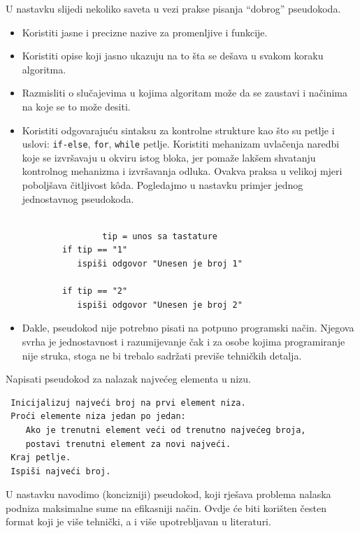 U nastavku slijedi nekoliko saveta u vezi prakse pisanja ``dobrog''  pseudo\-koda.
\begin{itemize}
	\item Koristiti jasne i precizne nazive za promenljive i funkcije.
	\item Koristiti opise koji jasno ukazuju na to šta se dešava u svakom koraku algoritma. 
	\item Razmisliti o slučajevima u kojima algoritam može da se zaustavi i načinima na koje  se to može desiti.
	\item Koristiti odgovarajuću sintaksu za kontrolne strukture kao što su petlje i uslovi: \texttt{if-else}, \texttt{for}, \texttt{while} petlje. Koristiti mehanizam uvlačenja naredbi koje se izvršavaju u okviru istog bloka, jer pomaže lakšem shvatanju kontrolnog mehanizma i izvršavanja odluka. Ovakva praksa u velikoj mjeri poboljšava čitljivost k\^oda. Pogledajmo u nasta\-vku primjer jednog jednostavnog pseudokoda.
	
	\begin{verbatim}
        
                tip = unos sa tastature
		if tip == "1"
		   ispiši odgovor "Unesen je broj 1"
		
		if tip == "2"
		   ispiši odgovor "Unesen je broj 2"
	\end{verbatim}
	
	\item Dakle, pseudokod nije potrebno pisati na potpuno programski način. Njegova svrha je jednostavnost i razumijevanje čak i za osobe kojima programiranje nije struka, stoga ne bi trebalo sadržati previše tehničkih detalja.
\end{itemize}

\begin{example} Napisati pseudokod za nalazak najvećeg elementa u nizu. \\
 \begin{verbatim}
 Inicijalizuj najveći broj na prvi element niza.
 Proći elemente niza jedan po jedan: 
    Ako je trenutni element veći od trenutno najvećeg broja,
    postavi trenutni element za novi najveći.
 Kraj petlje.
 Ispiši najveći broj.
 \end{verbatim}
 
\end{example}

U nastavku navodimo (koncizniji) pseudokod, koji rješava problema nalaska podniza  maksimalne sume na efikasniji način. Ovdje će biti korišten česten format koji je više tehnički, a i više upotrebljavan u literaturi. 
 
